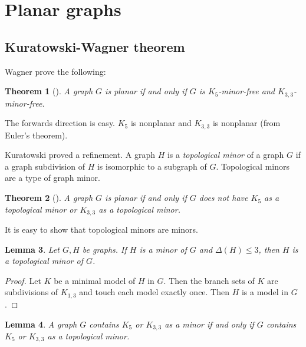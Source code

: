 \documentclass{article}
\author{Eric Luu}
\newtheorem{theorem}{Theorem}
\newtheorem{lemma}[theorem]{Lemma}
\begin{document}
\section{Planar graphs}

\subsection{Kuratowski-Wagner theorem}
Wagner \cite{wagnerUeberEigenschaftEbenen1937} prove the following:

\begin{theorem}[\cite{wagnerUeberEigenschaftEbenen1937}]
    A graph $G$ is planar if and only if $G$ is $K_5$-minor-free and $K_{3,3}$-minor-free. 
\end{theorem}
The forwards direction is easy. $K_5$ is nonplanar and $K_{3,3}$ is nonplanar (from Euler's theorem). 

Kuratowski \cite{kuratowskiProblemeCourbesGauches1930} proved a refinement. A graph $H$ is a \textit{topological minor} of a graph $G$ if a graph subdivision of $H$ is isomorphic to a subgraph of $G$. Topological minors are a type of graph minor.

\begin{theorem}[\cite{kuratowskiProblemeCourbesGauches1930}]
    A graph $G$ is planar if and only if $G$ does not have $K_5$ as a topological minor or $K_{3,3}$ as a topological minor. 
\end{theorem}

It is easy to show that topological minors are minors. 

\begin{lemma}
    Let $G, H$ be graphs. If $H$ is a minor of $G$ and $\Delta(H) \leq 3$, then $H$ is a topological minor of $G$.
\end{lemma}

\begin{proof}
    Let $K$ be a minimal model of $H$ in $G$. Then the branch sets of $K$ are subdivisions of $K_{1,3}$ and touch each model exactly once. Then $H$ is a model in $G$. 
\end{proof}

\begin{lemma}
    A graph $G$ contains $K_5$ or $K_{3,3}$ as a minor if and only if $G$ contains $K_5$ or $K_{3,3}$ as a topological minor. 
\end{lemma}
\end{document}
